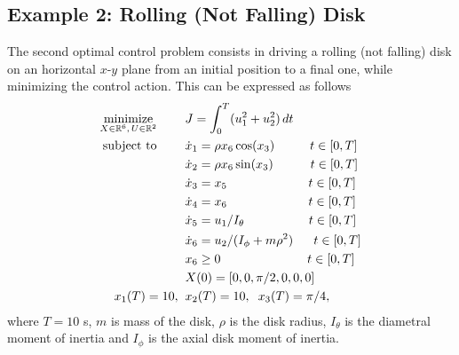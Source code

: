\subsection*{Example 2: Rolling (Not Falling) Disk}
The second optimal control problem consists in driving a rolling (not falling) disk on an horizontal $x$-$y$ plane from an initial position to a final one, while minimizing the control action. This can be expressed as follows
\begin{subequations}\label{eq:disk}
	\begin{align}
	\underset{X \in \mathbb{R}^{6}, \, U \in \mathbb{R}^{2}}{\text{minimize}}\hspace{8mm}
	&J = \int_{0}^{T}(u_{1}^{2} +  u_{2}^{2})\,dt  \label{eq:diskcost}\\
	\text{subject to} \hspace{8mm}
	& \dot{x}_1 = \rho x_6  \cos(x_3) \hspace{10mm} t \in[0,T] \label{eq:diskdyn1}\\
	& \dot{x}_2 = \rho x_6  \sin(x_3)\hspace{10.5mm} t \in[0,T] \label{eq:diskdyn2}\\
	& \dot{x}_3 = x_5\hspace{23mm} t \in[0,T] \label{eq:diskdyn3}\\
	& \dot{x}_4 = x_6\hspace{23mm} t \in[0,T] \label{eq:diskdyn4}\\
	& \dot{x}_5 = u_1/I_{\theta}\hspace{18.2mm} t \in[0,T] \label{eq:diskdyn5}\\
	& \dot{x}_6 = u_2/(I_{\phi} + m \rho^{2})\hspace{5.8mm} t \in[0,T] \label{eq:diskdyn6}\\
	& x_6 \geq 0  \hspace{24.5mm} t \in[0,T]\\
	&X(0) = [0, 0, \pi/2, 0, 0, 0]\\	
	 x_1(T) = 10,\hspace{2mm} &x_2(T) = 10, \hspace{2mm} x_3(T) = \pi/4, \label{eq:diskfinal1}		
	\end{align}
\end{subequations}
where $T = 10$ s, $m$ is mass of the disk, $\rho$ is the disk radius, $I_{\theta}$ is the diametral moment of inertia and
$I_{\phi}$ is the axial disk moment of inertia.
